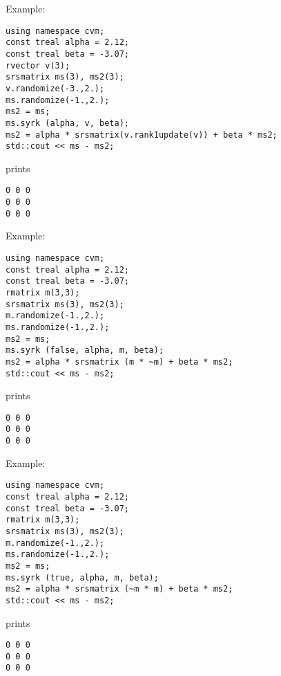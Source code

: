 Example:
\begin{Verbatim}
using namespace cvm;
const treal alpha = 2.12;
const treal beta = -3.07;
rvector v(3);
srsmatrix ms(3), ms2(3);
v.randomize(-3.,2.);
ms.randomize(-1.,2.);
ms2 = ms;
ms.syrk (alpha, v, beta);
ms2 = alpha * srsmatrix(v.rank1update(v)) + beta * ms2;
std::cout << ms - ms2;
\end{Verbatim}
prints
\begin{Verbatim}
0 0 0
0 0 0
0 0 0
\end{Verbatim}
Example:
\begin{Verbatim}
using namespace cvm;
const treal alpha = 2.12;
const treal beta = -3.07;
rmatrix m(3,3);
srsmatrix ms(3), ms2(3);
m.randomize(-1.,2.);
ms.randomize(-1.,2.);
ms2 = ms;
ms.syrk (false, alpha, m, beta);
ms2 = alpha * srsmatrix (m * ~m) + beta * ms2;
std::cout << ms - ms2;
\end{Verbatim}
prints
\begin{Verbatim}
0 0 0
0 0 0
0 0 0
\end{Verbatim}
Example:
\begin{Verbatim}
using namespace cvm;
const treal alpha = 2.12;
const treal beta = -3.07;
rmatrix m(3,3);
srsmatrix ms(3), ms2(3);
m.randomize(-1.,2.);
ms.randomize(-1.,2.);
ms2 = ms;
ms.syrk (true, alpha, m, beta);
ms2 = alpha * srsmatrix (~m * m) + beta * ms2;
std::cout << ms - ms2;
\end{Verbatim}
prints
\begin{Verbatim}
0 0 0
0 0 0
0 0 0
\end{Verbatim}
\newpage




